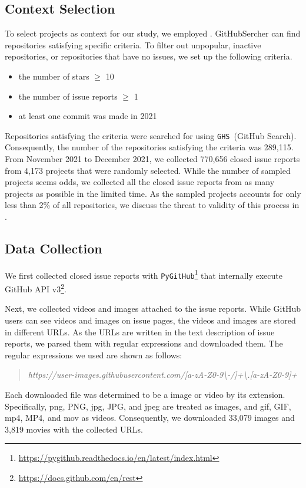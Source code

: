 \subsection{Context Selection}
To select projects as context for our study, we employed . GitHubSercher can find repositories satisfying specific criteria. To filter out unpopular, inactive repositories, or repositories that have no issues, we set up the following criteria.
\begin{itemize}
	\item the number of stars $\geq$ 10
	\item the number of issue reports $\geq$ 1
	\item at least one commit was made in 2021
\end{itemize}
Repositories satisfying the criteria were searched for using \texttt{GHS}~(GitHub Search)\citep{msr2021data}.
Consequently, the number of the repositories satisfying the criteria was 289,115. From November 2021 to December 2021, we collected 770,656 closed issue reports from 4,173 projects that were randomly selected. While the number of sampled projects seems odds, we collected all the closed issue reports from as many projects as possible in the limited time.  
As the sampled projects accounts for only less than 2\% of all repositories, we discuss the threat to validity of this process in . 


% 

\subsection{Data Collection}
We first collected closed issue reports with \texttt{PyGitHub}\footnote{\url{https://pygithub.readthedocs.io/en/latest/index.html}} that internally execute GitHub API v3\footnote{\url{https://docs.github.com/en/rest}}. 

Next, we collected videos and images attached to the issue reports. While GitHub users can see videos and images on issue pages, the videos and images are stored in different URLs. As the URLs are written in the text description of issue reports, we parsed them with regular expressions and downloaded them. The regular expressions we used are shown as follows:
\begin{quote}
\addtolength\leftmargini{0in}
{\it https://user-images.githubusercontent.com/[a-zA-Z0-9\textbackslash-/]+\textbackslash.[a-zA-Z0-9]+}
\end{quote}
Each downloaded file was determined to be a image or video by its extension. Specifically, png, PNG, jpg, JPG, and jpeg are treated as images, and  gif, GIF, mp4, MP4, and mov as videos.
Consequently, we downloaded 33,079 images and 3,819 movies
with the collected URLs. 

